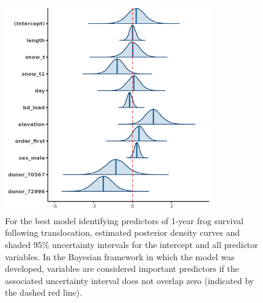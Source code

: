 \documentclass[9pt,twoside,lineno]{pnas-new}
\begin{document}
\begin{figure}

{\centering \includegraphics[width=0.8\textwidth]{figures/mcmc_areas_m1d.png}

}

\caption{\label{fig-survival-postdens}For the best model identifying
predictors of 1-year frog survival following translocation, estimated
posterior density curves and shaded 95\% uncertainty intervals for the
intercept and all predictor variables. In the Bayesian framework in
which the model was developed, variables are considered important
predictors if the associated uncertainty interval does not overlap zero
(indicated by the dashed red line).}

\end{figure}\clearpage
\end{document}
